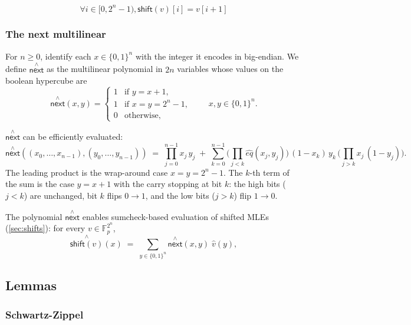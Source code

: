 \documentclass{article}
\theoremstyle{definition}
\newcommand{\Fp}{\mathbb F_p}
\newcommand{\nextmle}{\overset{\scriptscriptstyle\wedge}{\textsf{next}}}
\begin{document}
$$
\forall i \in [0, 2^n - 1), \mathsf{shift}(v)[i] = v[i + 1]
$$

\subsubsection{The next multilinear}\label{sec:next-mle}

For $n \geq 0$, identify each $x \in \{0,1\}^n$ with the integer it encodes in big-endian. We define $\nextmle$ as the multilinear polynomial in $2n$ variables whose values on the boolean hypercube are
\[
\nextmle(x, y) =
\begin{cases}
1 & \text{if } y = x + 1, \\
1 & \text{if } x = y = 2^n - 1, \\
0 & \text{otherwise},
\end{cases}
\qquad x, y \in \{0,1\}^n .
\]

$\nextmle$ can be efficiently evaluated:
\[
\nextmle((x_0, \ldots, x_{n-1}), (y_0, \ldots, y_{n-1})) \;=\; \prod_{j=0}^{n-1} x_j\, y_j \;+\; \sum_{k=0}^{n-1} \Bigg( \prod_{j<k} \hat{eq}(x_j, y_j) \Bigg)\, (1 - x_k)\, y_k \, \Bigg( \prod_{j>k} x_j\, (1 - y_j) \Bigg) .
\]
The leading product is the wrap-around case $x = y = 2^n - 1$. The $k$-th term of the sum is the case $y = x + 1$ with the carry stopping at bit $k$: the high bits ($j < k$) are unchanged, bit $k$ flips $0 \to 1$, and the low bits ($j > k$) flip $1 \to 0$.

The polynomial $\nextmle$ enables sumcheck-based evaluation of shifted MLEs (\cref{sec:shifts}): for every $v \in \Fp^{2^n}$,
\[
\overset{\scriptscriptstyle\wedge}{\textsf{shift}(v)}(x) \;=\; \sum_{y \in \{0,1\}^n} \nextmle(x, y)\; \hat{v}(y) ,
\]

\subsection{Lemmas}

\subsubsection{Schwartz-Zippel}
\end{document}
